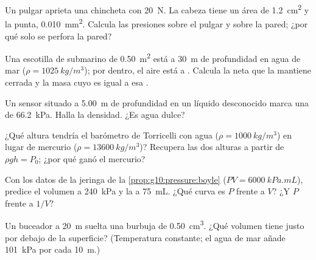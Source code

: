 \begin{exercise}[$\star\star$]\label{exo:g10:pressure:6}
Un pulgar aprieta una chincheta con \qty{20}{N}. La cabeza tiene un área
de \qty{1.2}{cm^2} y la punta, \qty{0.010}{mm^2}. Calcula las presiones
sobre el pulgar y sobre la pared; ¿por qué solo se perfora la pared?
\end{exercise}

\begin{exercise}[$\star\star$]\label{exo:g10:pressure:7}
Una escotilla de submarino de \qty{0.50}{m^2} está a \qty{30}{m} de
profundidad en agua de mar ($\rho = \qty{1025}{kg/m^3}$); por dentro, el
aire está a . Calcula la  neta que la mantiene
cerrada y la masa cuyo  es igual a esa .
\end{exercise}

\begin{exercise}[$\star\star$]\label{exo:g10:pressure:8}
Un sensor situado a \qty{5.00}{m} de profundidad en un líquido
desconocido marca una  de \qty{66.2}{kPa}. Halla la
densidad. ¿Es agua dulce?
\end{exercise}

\begin{exercise}[$\star\star$]\label{exo:g10:pressure:9}
¿Qué altura tendría el barómetro de Torricelli con agua
($\rho = \qty{1000}{kg/m^3}$) en lugar de mercurio
($\rho = \qty{13600}{kg/m^3}$)? Recupera las dos alturas a partir de
$\rho g h = P_0$; ¿por qué ganó el mercurio?
\end{exercise}

\begin{exercise}[$\star\star$]\label{exo:g10:pressure:10}
Con los datos de la jeringa de la \cref{prop:g10:pressure:boyle}
($PV = \qty{6000}{kPa.mL}$), predice el volumen a \qty{240}{kPa} y la
 a \qty{75}{mL}. ¿Qué curva es $P$ frente a $V$? ¿Y $P$ frente a
$1/V$?
\end{exercise}

\begin{exercise}[$\star\star$]\label{exo:g10:pressure:11}
Un buceador a \qty{20}{m} suelta una burbuja de \qty{0.50}{cm^3}. ¿Qué
volumen tiene justo por debajo de la superficie? (Temperatura constante;
el agua de mar añade \qty{101}{kPa} por cada \qty{10}{m}.)
\end{exercise}

